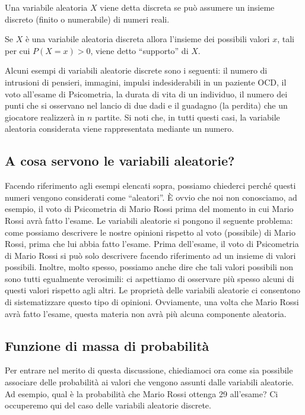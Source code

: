 \begin{defn}
Una variabile aleatoria $X$ viene detta discreta se può assumere un insieme discreto (finito o numerabile) di numeri reali.
\end{defn}
Se $X$ è una variabile aleatoria discreta allora l'insieme dei possibili valori $x$, tali per cui $P(X = x) > 0$, viene detto \enquote{supporto} di $X$.

Alcuni esempi di variabili aleatorie discrete sono i seguenti: 
 il numero di intrusioni di pensieri, immagini, impulsi indesiderabili in un paziente OCD, 
il voto all'esame di Psicometria,
la durata di vita di un individuo,
il numero dei punti che si osservano nel lancio di due dadi e
 il guadagno (la perdita) che un giocatore realizzerà in $n$ partite.
Si noti che, in tutti questi casi, la variabile aleatoria considerata viene rappresentata mediante un numero.

\subsection{A cosa servono le variabili aleatorie?}

Facendo riferimento agli esempi elencati sopra, possiamo chiederci perché questi numeri vengono considerati come \enquote{aleatori}.
È ovvio che noi non conosciamo, ad esempio, il voto di Psicometria di Mario Rossi prima del momento in cui Mario Rossi avrà fatto l'esame.
Le variabili aleatorie si pongono il seguente problema: come possiamo descrivere le nostre opinioni rispetto al voto (possibile) di Mario Rossi, prima che lui abbia fatto l'esame.
Prima dell'esame, il voto di Psicometria di Mario Rossi si può solo descrivere facendo riferimento ad un insieme di valori possibili.
Inoltre, molto spesso, possiamo anche dire che tali valori possibili non sono tutti egualmente verosimili: ci aspettiamo di osservare più spesso alcuni di questi valori rispetto agli altri.
Le proprietà delle variabili aleatorie ci consentono di sistematizzare questo tipo di opinioni.
Ovviamente, una volta che Mario Rossi avrà fatto l'esame, questa materia non avrà più alcuna componente aleatoria.


\subsection{Funzione di massa di probabilità}

Per entrare nel merito di questa discussione, chiediamoci ora come sia possibile associare delle probabilità ai valori che vengono assunti dalle variabili aleatorie.
Ad esempio, qual è la probabilità che Mario Rossi ottenga 29 all'esame?
Ci occuperemo qui del caso delle variabili aleatorie discrete.


